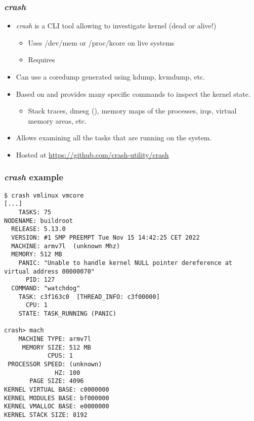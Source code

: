 \begin{frame}
  \frametitle{{\em crash}}
  \begin{itemize}
    \item {\em crash} is a CLI tool allowing to investigate kernel (dead or
      alive!)
    \begin{itemize}
      \item Uses /dev/mem or /proc/kcore on live systems
      \item Requires 
    \end{itemize}
    \item Can use a coredump generated using kdump, kvmdump, etc.
    \item Based on  and provides many specific commands to inspect the
      kernel state.
    \begin{itemize}
      \item Stack traces, dmesg (), memory maps of the processes,
            irqs, virtual memory areas, etc.
    \end{itemize}
    \item Allows examining all the tasks that are running on the system.
    \item Hosted at \url{https://github.com/crash-utility/crash}
  \end{itemize}
\end{frame}

\begin{frame}[fragile]
  \frametitle{{\em crash} example}
  \begin{itemize}
    \begin{block}{}
      \begin{verbatim}
$ crash vmlinux vmcore
[...]
    TASKS: 75
NODENAME: buildroot
  RELEASE: 5.13.0
  VERSION: #1 SMP PREEMPT Tue Nov 15 14:42:25 CET 2022
  MACHINE: armv7l  (unknown Mhz)
  MEMORY: 512 MB
    PANIC: "Unable to handle kernel NULL pointer dereference at virtual address 00000070"
      PID: 127
  COMMAND: "watchdog"
    TASK: c3f163c0  [THREAD_INFO: c3f00000]
      CPU: 1
    STATE: TASK_RUNNING (PANIC)

crash> mach
    MACHINE TYPE: armv7l
     MEMORY SIZE: 512 MB
            CPUS: 1
 PROCESSOR SPEED: (unknown)
              HZ: 100
       PAGE SIZE: 4096
KERNEL VIRTUAL BASE: c0000000
KERNEL MODULES BASE: bf000000
KERNEL VMALLOC BASE: e0000000
KERNEL STACK SIZE: 8192
      \end{verbatim}
    \end{block}
  \end{itemize}
\end{frame}

